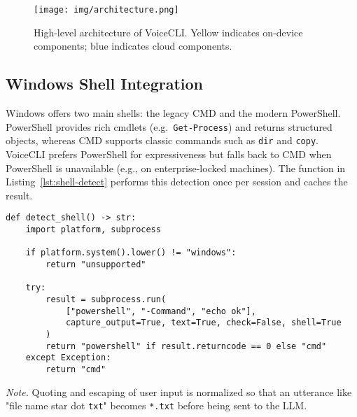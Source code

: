 \documentclass[a4paper,12pt]{article}
\begin{document}
\begin{figure}[H]
\centering
\texttt{[image: img/architecture.png]}
\caption{High-level architecture of VoiceCLI. Yellow indicates on-device components; blue indicates cloud components.}
\label{fig:architecture}
\end{figure}

\subsection{Windows Shell Integration}
\label{sec:windows-shell}
\noindent Windows offers two main shells: the legacy CMD and the modern PowerShell.  
PowerShell provides rich cmdlets (e.g.\ \texttt{Get-Process}) and returns structured
objects, whereas CMD supports classic commands such as \texttt{dir} and
\texttt{copy}.  VoiceCLI prefers PowerShell for expressiveness but falls back to
CMD when PowerShell is unavailable (e.g., on enterprise-locked machines).  The
function in Listing~\ref{lst:shell-detect} performs this detection once per
session and caches the result.

\newpage
\begin{lstlisting}[style=vscode,
                   caption={Shell detection with graceful fallback},
                   label={lst:shell-detect},
                   emph={detect_shell,subprocess}]
def detect_shell() -> str:
    import platform, subprocess

    if platform.system().lower() != "windows":
        return "unsupported"

    try:
        result = subprocess.run(
            ["powershell", "-Command", "echo ok"],
            capture_output=True, text=True, check=False, shell=True
        )
        return "powershell" if result.returncode == 0 else "cmd"
    except Exception:
        return "cmd"
\end{lstlisting}

\noindent
\textit{Note.} Quoting and escaping of user input is normalized so that an utterance
like "file name star dot \texttt{txt}" becomes \texttt{*.txt} before being sent
to the LLM.
\end{document}
